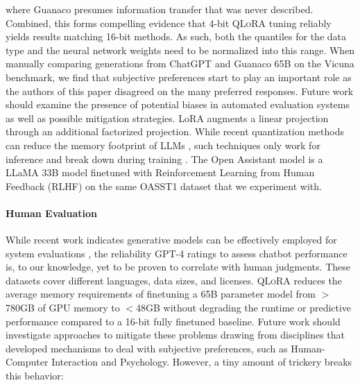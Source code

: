 where {Guanaco} presumes information transfer that was never described. Combined, this forms compelling evidence that 4-bit \textsc{QLoRA} tuning reliably yields results matching 16-bit methods. As such, both the quantiles for the data type and the neural network weights need to be normalized into this range. When manually comparing generations from ChatGPT and {Guanaco} 65B on the Vicuna benchmark, we find that subjective preferences start to play an important role as the authors of this paper disagreed on the many preferred responses. Future work should examine the presence of potential biases in automated evaluation systems as well as possible mitigation strategies. LoRA augments a linear projection through an additional factorized projection. While recent quantization methods can reduce the memory footprint of LLMs \citep{dettmers2022llm, dettmers2022case, frantar2022gptq, xiao2022smoothquant}, such techniques only work for inference and break down during training \citep{wortsman2023stable}. The Open Assistant model is a LLaMA 33B model finetuned with Reinforcement Learning from Human Feedback (RLHF) on the same OASST1 dataset that we experiment with. \paragraph{Human Evaluation} While recent work indicates generative models can be effectively employed for system evaluations \citep{fu2023gptscore}, the reliability GPT-4 ratings to assess chatbot performance is, to our knowledge, yet to be proven to correlate with human judgments. These datasets cover different languages, data sizes, and licenses. \textsc{QLoRA} reduces the average memory requirements of finetuning a 65B parameter model from $>$780GB of GPU memory to $<$48GB without degrading the runtime or predictive performance compared to a 16-bit fully finetuned baseline. Future work should investigate approaches to mitigate these problems drawing from disciplines that developed mechanisms to deal with subjective preferences, such as Human-Computer Interaction and Psychology. However, a tiny amount of trickery breaks this behavior:

